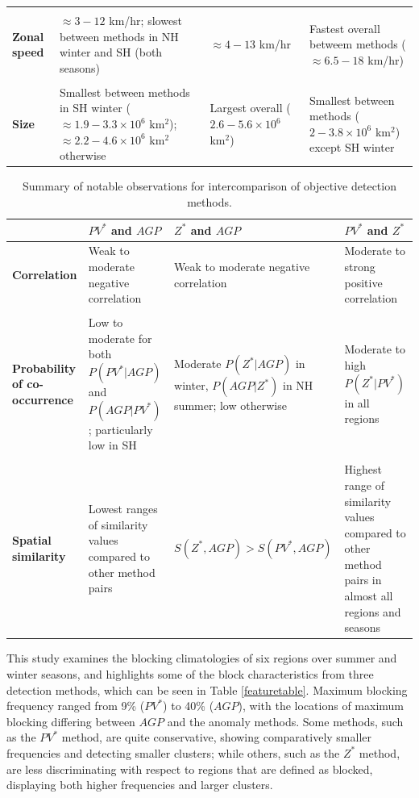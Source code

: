 \documentclass[smallextended]{svjour3}       %
\numberwithin{equation}{section}
\begin{document}
\begin{table}
\begin{tabular}[t]{|L{0.18\textwidth}|L{0.27\textwidth}|L{0.27\textwidth}|L{0.27\textwidth}|}
&&&\\
\textbf{Zonal speed}
& $\approx 3-12$ km/hr; slowest between methods in NH winter and SH (both seasons)
& $\approx 4-13$ km/hr
& Fastest overall betweem methods ($\approx6.5-18$ km/hr)\\
&&&\\
\textbf{Size}
& Smallest between methods in SH winter ($\approx 1.9-3.3\times 10^6$ km$^2$); $\approx 2.2-4.6\times 10^6$ km$^2$ otherwise
& Largest overall ($2.6-5.6\times 10^6$ km$^2$)
& Smallest between methods ($2-3.8\times 10^6$ km$^2$) except SH winter\\
\hline
\end{tabular}
\end{table}

\begin{table}
\caption{Summary of notable observations for intercomparison of objective detection methods.} \label{inttable}
\begin{tabular}[t]{|L{0.18\textwidth}|L{0.27\textwidth}|L{0.27\textwidth}|L{0.27\textwidth}|}\hline
 &$PV^*$ and $AGP$& $Z^*$ and $AGP$ & $PV^*$ and $Z^*$\\
\hline
\textbf{Correlation }
& Weak to moderate negative correlation
& Weak to moderate negative correlation
& Moderate to strong positive correlation\\
&&&\\
\textbf{Probability of co-occurrence}
& Low to moderate for both $P(PV^*|AGP)$ and $P(AGP|PV^*)$; particularly low in SH
& Moderate $P(Z^*|AGP)$ in winter, $P(AGP|Z^*)$ in NH summer; low otherwise
& Moderate to high $P(Z^*|PV^*)$ in all regions\\
&&&\\
\textbf{Spatial similarity}
& Lowest ranges of similarity values compared to other method pairs
& $S(Z^*,AGP)>S(PV^*,AGP)$
&Highest range of similarity values compared to other method pairs in almost all regions and seasons\\

\hline
\end{tabular}
\end{table}

This study examines the blocking climatologies of six regions over summer and winter seasons, and highlights some of the block characteristics from three detection methods, which can be seen in Table \ref{featuretable}. Maximum blocking frequency ranged from 9\% ($PV^*$) to 40\% ($AGP$), with the locations of maximum blocking differing between $AGP$ and the anomaly methods. Some methods, such as the $PV^*$ method, are quite conservative, showing comparatively smaller frequencies and detecting smaller clusters; while others, such as the $Z^*$ method, are less discriminating with respect to regions that are defined as blocked, displaying both higher frequencies and larger clusters. 
\end{document}
